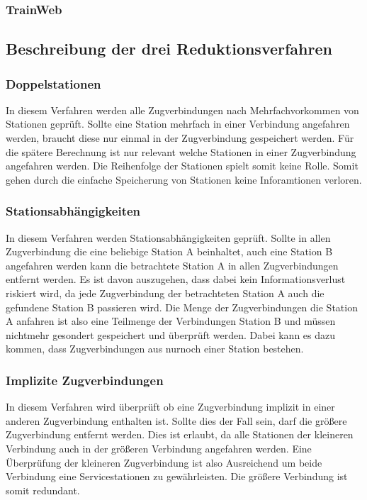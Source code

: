 \subsubsection{TrainWeb}\label{ver:subsubsec:trainweb}

\subsection{Beschreibung der drei Reduktionsverfahren}
\subsubsection{Doppelstationen}\label{ver:subsubsec:doppelstationen}
In diesem Verfahren werden alle Zugverbindungen nach Mehrfachvorkommen von Stationen geprüft. Sollte eine Station mehrfach in einer Verbindung angefahren werden, braucht diese nur einmal in der Zugverbindung gespeichert werden. Für die spätere Berechnung ist nur relevant welche Stationen in einer Zugverbindung angefahren werden. Die Reihenfolge der Stationen spielt somit keine Rolle. Somit gehen durch die einfache Speicherung von Stationen keine Inforamtionen verloren.\\

\subsubsection{Stationsabhängigkeiten}
In diesem Verfahren werden Stationsabhängigkeiten geprüft. Sollte in allen Zugverbindung die eine beliebige Station A beinhaltet, auch eine Station B angefahren werden kann die betrachtete Station A in allen Zugverbindungen entfernt werden. Es ist davon auszugehen, dass dabei kein Informationsverlust riskiert wird, da jede Zugverbindung der betrachteten Station A auch die gefundene Station B passieren wird. Die Menge der Zugverbindungen die Station A anfahren ist also eine Teilmenge der Verbindungen Station B und müssen nichtmehr gesondert gespeichert und überprüft werden. Dabei kann es dazu kommen, dass Zugverbindungen aus nurnoch einer Station bestehen.\\

\subsubsection{Implizite Zugverbindungen}
In diesem Verfahren wird überprüft ob eine Zugverbindung implizit in einer anderen Zugverbindung enthalten ist. Sollte dies der Fall sein, darf die größere Zugverbindung entfernt werden. Dies ist erlaubt, da alle Stationen der kleineren Verbindung auch in der größeren Verbindung angefahren werden. Eine Überprüfung der kleineren Zugverbindung ist also Ausreichend um beide Verbindung eine Servicestationen zu gewährleisten. Die größere Verbindung ist somit redundant.\\

